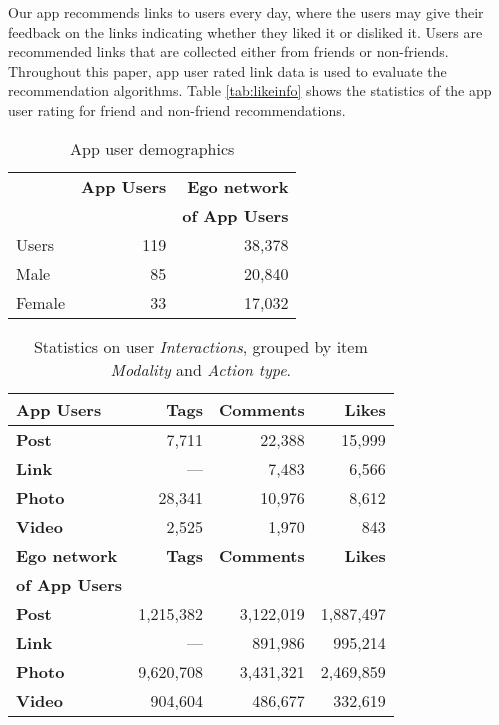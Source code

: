Our app recommends links to users every day, where the users may give their feedback on the links indicating whether they liked it or disliked it. Users are recommended
links that are collected either from friends or non-friends. Throughout this paper, app user rated link data is used to evaluate the recommendation algorithms. 
Table \ref{tab:likeinfo} shows the statistics of the app user rating for friend and non-friend recommendations.
      							
\begin{table}
\centering
\begin{tabular}{|>{\small}l|>{\small}r|>{\small}r|}
\hline
& \textbf{App Users} & \textbf{Ego network} \\
& & \textbf{of App Users} \\
\hline
Users & 119 & 38,378 \\
\hline
Male & 85 & 20,840 \\
\hline
Female & 33 & 17,032 \\
\hline
\end{tabular}
\caption{App user demographics}
\label{tab:demographics}
\end{table}

\begin{table}
\centering
\begin{tabular}{|>{\small}l|>{\small}r|>{\small}r|>{\small}r|}
\hline
\textbf{App Users} & \textbf{Tags} & \textbf{Comments} & \textbf{Likes} \\
\hline
\textbf{Post} & 7,711 & 22,388 & 15,999 \\
\hline
\textbf{Link}  & --- & 7,483 & 6,566 \\
\hline
\textbf{Photo} & 28,341 & 10,976 & 8,612 \\
\hline
\textbf{Video} & 2,525 & 1,970 & 843 \\
\hline
\hline
\textbf{Ego network} & \textbf{Tags} & \textbf{Comments} & \textbf{Likes} \\
\textbf{of App Users}  & & & \\
\hline
\textbf{Post} & 1,215,382 & 3,122,019 & 1,887,497 \\
\hline
\textbf{Link} & --- & 891,986 & 995,214 \\
\hline
\textbf{Photo} & 9,620,708 & 3,431,321 & 2,469,859 \\
\hline
\textbf{Video} & 904,604 & 486,677 & 332,619 \\
\hline
\end{tabular}
\caption{Statistics on user {\em Interactions}, grouped by item {\em Modality} and {\em Action type}.}
\label{tab:interactions}
\end{table}



